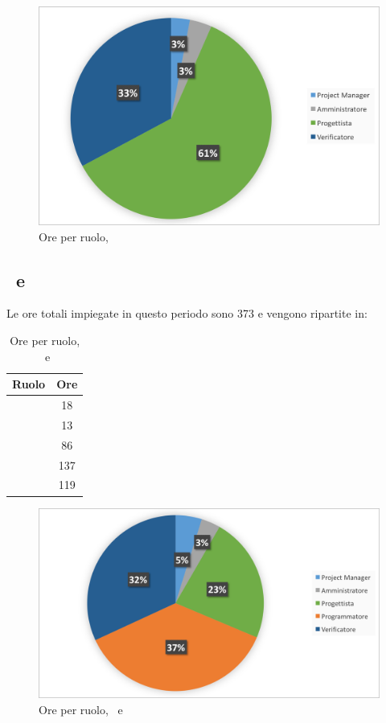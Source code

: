\begin{figure}[H]
	\centering 
	\includegraphics[scale=0.7]{Immagini/GraficiTorte/PA.png}
	\caption{Ore per ruolo, \PA}
\end{figure}

\newpage
\subsection{\PD\ e \COD}
Le ore totali impiegate in questo periodo sono 373 e vengono ripartite in:

\begin{table}[h]
	\begin{center}
		\begin{tabular}{|c|c|}
			\hline
			\textbf{Ruolo}	& \textbf{Ore} \\
			\hline
			\Pm &	18\\
			\hline
			\Am	&	13\\
			\hline
			\Prog	&	86\\
			\hline
			\Progr	&	137\\
			\hline
			\Ver	&	119\\
			\hline
		\end{tabular}
	\end{center}
	\caption{Ore per ruolo, \PD\ e \COD}
\end{table}

\begin{figure}[H]
	\centering 
	\includegraphics[scale=0.7]{Immagini/GraficiTorte/PDCOD.png}
	\caption{Ore per ruolo, \PD\ e \COD}
\end{figure}

